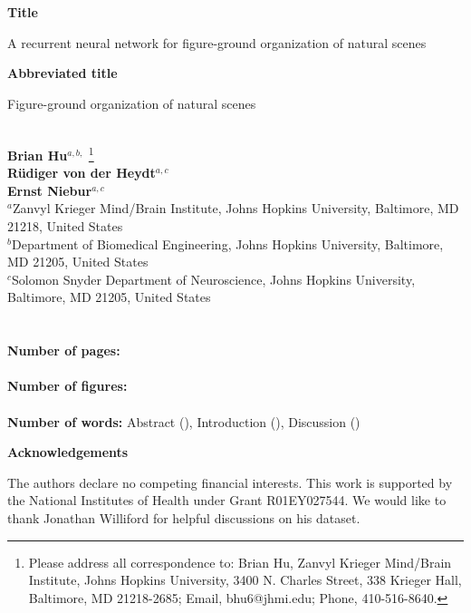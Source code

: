 \documentclass[12pt]{article}
\renewcommand{\thefootnote}{\normalsize \arabic{footnote}}
\begin{document}
\begin{flushleft} {\bf Title} \end{flushleft}
A recurrent neural network for figure-ground organization of natural scenes

\begin{flushleft} {\bf Abbreviated title} \end{flushleft}
Figure-ground organization of natural scenes

\ \\
{\bf Brian Hu$^{\displaystyle a, \displaystyle b, }$}
\footnote[1]{Please address all correspondence to: Brian Hu, Zanvyl Krieger Mind/Brain Institute, Johns Hopkins University, 3400 N. Charles Street, 338 Krieger Hall, Baltimore, MD 21218-2685; Email, bhu6@jhmi.edu; Phone, 410-516-8640.}\\
{\bf R\"{u}diger von der Heydt$^{\displaystyle a, \displaystyle c}$}\\
{\bf Ernst Niebur$^{\displaystyle a, \displaystyle c}$}\\
{$^{\displaystyle a}$Zanvyl Krieger Mind/Brain Institute, Johns Hopkins University, Baltimore, MD 21218, United States}\\
{$^{\displaystyle b}$Department of Biomedical Engineering, Johns Hopkins University, Baltimore, MD 21205, United States}\\
{$^{\displaystyle c}$Solomon Snyder Department of Neuroscience, Johns
  Hopkins University, Baltimore, MD 21205, United States}\\

\ \\
\ \\
{\bf Number of pages:}  %
\\
\ \\
{\bf Number of figures:} 
\ \\
\\
{\bf Number of words:} Abstract (), Introduction (), Discussion ()
\\

\begin{flushleft} {\bf Acknowledgements} \end{flushleft}
The authors declare no competing financial interests.
%
This work is supported by the National Institutes of Health under Grant R01EY027544.
We would like to thank Jonathan Williford for helpful discussions on his dataset.
\clearpage

\renewcommand{\thefootnote}{\normalsize \arabic{footnote}} 	
\end{document}
